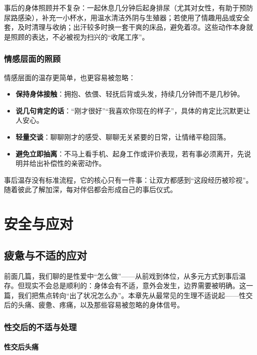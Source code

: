 \documentclass[12pt,UTF8]{ctexbook}
\begin{document}
事后的身体照顾并不复杂：一起休息几分钟后起身排尿（尤其对女性，有助于预防尿路感染），补充一小杯水，用温水清洁外阴与生殖器；若使用了情趣用品或安全套，及时清理与收纳；出汗较多时换一套干爽的床品，避免着凉。这些动作本身就是照顾的表达，不必被视为扫兴的“收尾工序”。

\section{情感层面的照顾}

情感层面的温存更简单，也更容易被忽略：
\begin{itemize}
\item \textbf{保持身体接触}：拥抱、依偎、轻抚后背或头发，持续几分钟而不是几秒钟。
\item \textbf{说几句肯定的话}：“刚才很好”“我喜欢你现在的样子”，具体的肯定比沉默更让人安心。
\item \textbf{轻量交谈}：聊聊刚才的感受、聊聊无关紧要的日常，让情绪平稳回落。
\item \textbf{避免立即抽离}：不马上看手机、起身工作或评价表现，若有事必须离开，先说明并给出补偿性的亲密动作。
\end{itemize}

事后温存没有标准流程，它的核心只有一件事：让双方都感到“这段经历被珍视”。随着彼此了解加深，每对伴侣都会形成自己的事后仪式。

\part{安全与应对}

\chapter{疲惫与不适的应对}

前面几篇，我们聊的是性爱中“怎么做”——从前戏到体位，从多元方式到事后温存。但现实不会总是顺利的：身体会有不适，意外会发生，边界需要被明确。这一篇，我们把焦点转向“出了状况怎么办”。本章先从最常见的生理不适说起——性交后的头痛、疲惫、疼痛，以及那些容易被忽略的身体信号。

\section{性交后的不适与处理}

\subsection{性交后头痛}
\end{document}
